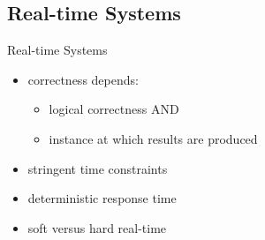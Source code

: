 \documentclass[10pt,hyperref={hyperfootnotes=false}, xcolor={usenames, dvipsnames}]{beamer}
\begin{document}
\subsection{Real-time Systems}
\begin{frame}{Real-time Systems}
  \begin{itemize}
  \item {correctness depends:\pause{}
			\begin{itemize}
        	   \item {logical correctness}  \pause{}  AND
			   \item {instance at which results are produced}  \pause{} 
	        \end{itemize}
		}
  \item {stringent time constraints} \pause{}
  	\begingroup
	
	\endgroup
    \pause{}
  \item {deterministic response time} 
  \item {soft versus hard real-time}
  \end{itemize}
\end{frame}

\end{document}
